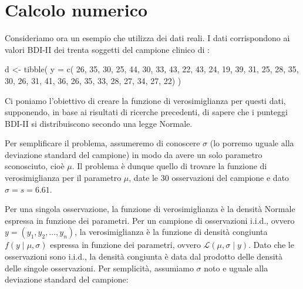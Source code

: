 \documentclass[
  11pt,
]{krantz}
\makeatletter
\newenvironment{Shaded}{\begin{snugshade}}{\end{snugshade}}
\newcommand{\AttributeTok}[1]{\textcolor[rgb]{0.61,0.61,0.61}{#1}}
\newcommand{\DecValTok}[1]{\textcolor[rgb]{0.06,0.06,0.06}{#1}}
\newcommand{\FunctionTok}[1]{\textcolor[rgb]{0,0,0}{#1}}
\newcommand{\NormalTok}[1]{#1}
\newcommand{\OtherTok}[1]{\textcolor[rgb]{0.37,0.37,0.37}{#1}}
\newenvironment{kframe}{%
\medskip{}
\setlength{\fboxsep}{.8em}
 \def\at@end@of@kframe{}%
 \ifinner\ifhmode%
  \def\at@end@of@kframe{\end{minipage}}%
  \begin{minipage}{\columnwidth}%
 \fi\fi%
 \def\FrameCommand##1{\hskip\@totalleftmargin \hskip-\fboxsep
 \colorbox{shadecolor}{##1}\hskip-\fboxsep
     \hskip-\linewidth \hskip-\@totalleftmargin \hskip\columnwidth}%
 \MakeFramed {\advance\hsize-\width
   \@totalleftmargin\z@ \linewidth\hsize
   \@setminipage}}%
 {\par\unskip\endMakeFramed%
 \at@end@of@kframe}
\renewenvironment{Shaded}{\begin{kframe}}{\end{kframe}}
\theoremstyle{definition}
\theoremstyle{definition}
\theoremstyle{definition}
\theoremstyle{definition}
\theoremstyle{remark}
\makeatother
\begin{document}
\hypertarget{calcolo-numerico-1}{%
\section*{Calcolo numerico}\label{calcolo-numerico-1}}


Consideriamo ora un esempio che utilizza dei dati reali. I dati corrispondono ai valori BDI-II dei trenta soggetti del campione clinico di \citet{zetschefuture2019}:

\begin{Shaded}
\begin{Highlighting}[]
\NormalTok{d }\OtherTok{\textless{}{-}} \FunctionTok{tibble}\NormalTok{(}
  \AttributeTok{y =} \FunctionTok{c}\NormalTok{(}
    \DecValTok{26}\NormalTok{, }\DecValTok{35}\NormalTok{, }\DecValTok{30}\NormalTok{, }\DecValTok{25}\NormalTok{, }\DecValTok{44}\NormalTok{, }\DecValTok{30}\NormalTok{, }\DecValTok{33}\NormalTok{, }\DecValTok{43}\NormalTok{, }\DecValTok{22}\NormalTok{, }\DecValTok{43}\NormalTok{, }\DecValTok{24}\NormalTok{, }\DecValTok{19}\NormalTok{, }\DecValTok{39}\NormalTok{, }\DecValTok{31}\NormalTok{, }\DecValTok{25}\NormalTok{, }\DecValTok{28}\NormalTok{, }\DecValTok{35}\NormalTok{, }\DecValTok{30}\NormalTok{, }
    \DecValTok{26}\NormalTok{, }\DecValTok{31}\NormalTok{, }\DecValTok{41}\NormalTok{, }\DecValTok{36}\NormalTok{, }\DecValTok{26}\NormalTok{, }\DecValTok{35}\NormalTok{, }\DecValTok{33}\NormalTok{, }\DecValTok{28}\NormalTok{, }\DecValTok{27}\NormalTok{, }\DecValTok{34}\NormalTok{, }\DecValTok{27}\NormalTok{, }\DecValTok{22}\NormalTok{)}
\NormalTok{)}
\end{Highlighting}
\end{Shaded}

Ci poniamo l'obiettivo di creare la funzione di verosimiglianza per questi dati, supponendo, in base ai risultati di ricerche precedenti, di sapere che i punteggi BDI-II si distribuiscono secondo una legge Normale.

Per semplificare il problema, assumeremo di conoscere \(\sigma\) (lo porremo uguale alla deviazione standard del campione) in modo da avere un solo parametro sconosciuto, cioè \(\mu\). Il problema è dunque quello di trovare la funzione di verosimiglianza per il parametro \(\mu\), date le 30 osservazioni del campione e dato \(\sigma = s = 6.61\).

Per una singola osservazione, la funzione di verosimiglianza è la densità Normale espressa in funzione dei parametri. Per un campione di osservazioni i.i.d., ovvero \(y = (y_1, y_2, \dots, y_n)\), la verosimiglianza è la funzione di densità congiunta \(f(y \mid \mu, \sigma)\) espressa in funzione dei parametri, ovvero \(\mathcal{L}(\mu, \sigma \mid y)\). Dato che le osservazioni sono i.i.d., la densità congiunta è data dal prodotto delle densità delle singole osservazioni. Per semplicità, assumiamo \(\sigma\) noto e uguale alla deviazione standard del campione:
\end{document}
